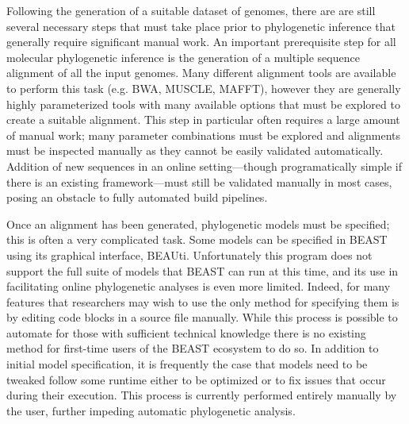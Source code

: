 Following the generation of a suitable dataset of genomes, there are are still several necessary steps that must take place prior to phylogenetic inference that generally require significant manual work.
An important prerequisite step for all molecular phylogenetic inference is the generation of a multiple sequence alignment of all the input genomes.
Many different alignment tools are available to perform this task (e.g. BWA, MUSCLE, MAFFT), however they are generally highly parameterized tools with many available options that must be explored to create a suitable alignment.
This step in particular often requires a large amount of manual work; many parameter combinations must be explored and alignments must be inspected manually as they cannot be easily validated automatically.
Addition of new sequences in an online setting---though programatically simple if there is an existing framework---must still be validated manually in most cases, posing an obstacle to fully automated build pipelines.

Once an alignment has been generated, phylogenetic models must be specified; this is often a very complicated task.
Some models can be specified in BEAST using its graphical interface, BEAUti.
Unfortunately this program does not support the full suite of models that BEAST can run at this time, and its use in facilitating online phylogenetic analyses is even more limited.
Indeed, for many features that researchers may wish to use the only method for specifying them is by editing code blocks in a source file manually.
While this process is possible to automate for those with sufficient technical knowledge there is no existing method for first-time users of the BEAST ecosystem to do so.
In addition to initial model specification, it is frequently the case that models need to be tweaked follow some runtime either to be optimized or to fix issues that occur during their execution.
This process is currently performed entirely manually by the user, further impeding automatic phylogenetic analysis.

